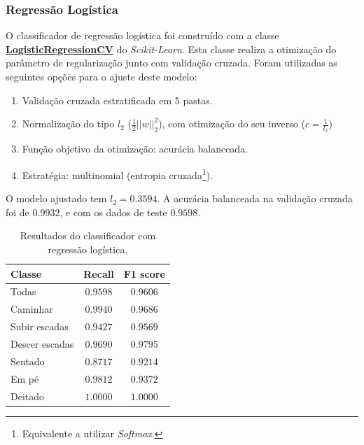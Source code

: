 \documentclass[final,5p]{elsarticle}
\numberwithin{equation}{section}
\begin{document}
        \subsubsection{Regressão Logística}

        O classificador de regressão logística foi construído com a classe \href{https://scikit-learn.org/stable/modules/generated/sklearn.linear_model.LogisticRegressionCV.html}{\textbf{LogisticRegressionCV}} do \emph{Scikit-Learn}. Esta classe realiza a otimização do parâmetro de regularização junto com validação cruzada. Foram utilizadas as seguintes opções para o ajuste deste modelo:

        \begin{enumerate}
            \item Validação cruzada estratificada em 5 pastas.
            \item Normalização do tipo $l_2$ ($\frac{1}{2} ||w||_2^2$), com otimização do seu inverso ($c = \frac{1}{l_2}$)
            \item Função objetivo da otimização: acurácia balanceada.
            \item Estratégia: multinomial (entropia cruzada\footnote{Equivalente a utilizar \emph{Softmax}.}).
        \end{enumerate}

        O modelo ajustado tem $l_2 = 0.3594$. A acurácia balanceada na validação cruzada foi de $0.9932$, e com os dados de teste $0.9598$.

        \begin{table}[h]
            \centering
            \begin{tabular}{l c c}
                \toprule
                \textbf{Classe} & \textbf{Recall}  & \textbf{F1 score} \\
                \midrule
                Todas     & $0.9598$ & $0.9606$ \\
                \addlinespace
                Caminhar   & $0.9940$ & $0.9686$ \\
                Subir escadas   & $0.9427$ & $0.9569$ \\
                Descer escadas & $0.9690$ & $0.9795$ \\
                Sentado   & $0.8717$ & $0.9214$ \\
                Em pé  & $0.9812$ & $0.9372$ \\
                Deitado    & $1.0000$ & $1.0000$ \\
                \bottomrule
            \end{tabular}
            \caption{Resultados do classificador com regressão logística.}
            \label{tab:total_dados}
        \end{table}
\end{document}

